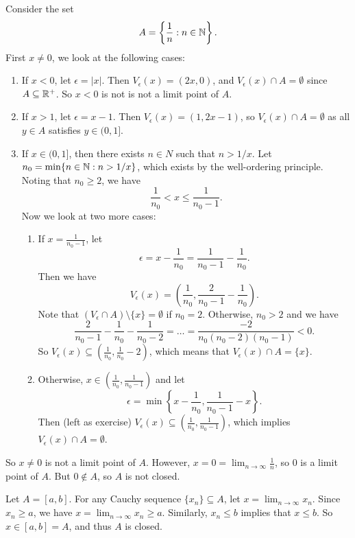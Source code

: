 \begin{example}
  Consider the set
  \[
    A = \left\{\frac{1}{n} : n \in \mathbb{N}\right\}
  .\]
  First $x \ne 0$, we look at the following cases:
  \begin{enumerate}
    \item If $x < 0$, let $\epsilon = |x|$. Then
    $V_\epsilon(x) = (2x, 0)$, and
    $V_\epsilon(x) \cap A = \emptyset$ since
    $A \subseteq \mathbb{R}^+$. So $x < 0$ is not
    is not a limit point of $A$.
  \item If $x > 1$, let $\epsilon = x - 1$. Then
    $V_\epsilon(x) = (1, 2x - 1)$, so
    $V_\epsilon(x) \cap A = \emptyset$ as all $y \in A$
    satisfies $y \in (0, 1]$.
  \item If $x \in (0, 1]$, then there exists $n \in N$
    such that $n > 1 / x$. Let
    $n_0 = \min\{n \in \mathbb{N} : n > 1 / x\}$, which exists
    by the well-ordering principle. Noting that
    $n_0 \ge 2$, we have
    \[
    \frac{1}{n_0} < x \le \frac{1}{n_0 - 1}
    .\]
    Now we look at two more cases:
    \begin{enumerate}
      \item If $x = \frac{1}{n_0 - 1}$, let
        \[\epsilon = x - \frac{1}{n_0} = \frac{1}{n_0 - 1} - \frac{1}{n_0}.\]
        Then we have
        \[
        V_\epsilon(x) = \left(\frac{1}{n_0}, \frac{2}{n_0 - 1} - \frac{1}{n_0}\right)
        .\]
        Note that
        $(V_\epsilon \cap A) \setminus \{x\} = \emptyset$ if $n_0 = 2$.
        Otherwise, $n_0 > 2$ and we have
        \[\frac{2}{n_0 - 1} - \frac{1}{n_0} - \frac{1}{n_0 - 2} = \dots = \frac{-2}{n_0(n_0 - 2)(n_0 - 1)} < 0.\]
        So $V_\epsilon(x) \subseteq \left(\frac{1}{n_0}, \frac{1}{n_0} - 2\right)$, which means that
        $V_\epsilon(x) \cap A = \{x\}$.
      \item Otherwise, $x \in \left(\frac{1}{n_0}, \frac{1}{n_0 - 1}\right)$
        and let
        \[\epsilon = \min\left\{x - \frac{1}{n_0}, \frac{1}{n_0 - 1} - x\right\}.\]
        Then (left as exercise)
        $V_\epsilon(x) \subseteq \left(\frac{1}{n_0}, \frac{1}{n_0 - 1}\right)$,
        which implies $V_\epsilon(x) \cap A = \emptyset$.
    \end{enumerate}
  \end{enumerate}
  So $x \ne 0$ is not a limit point of $A$. However,
  $x = 0 = \lim_{n \to \infty} \frac{1}{n}$, so $0$ is
  a limit point of $A$. But $0 \notin A$, so $A$ is
  not closed.
\end{example}

\begin{example}
  Let $A = [a, b]$. For any Cauchy sequence
  $\{x_n\} \subseteq A$, let
  $x = \lim_{n \to \infty} x_n$. Since
  $x_n \ge a$, we have $x = \lim_{n \to \infty} x_n \ge a$.
  Similarly, $x_n \le b$ implies that $x \le b$. So
  $x \in [a, b] = A$, and thus $A$ is closed.
\end{example}

